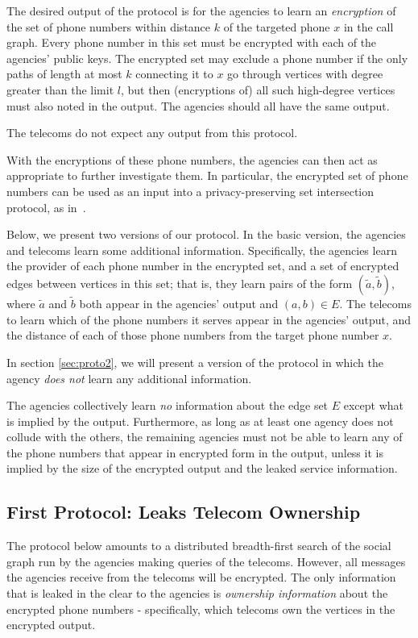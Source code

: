 The desired output of the protocol is for the agencies to learn an \emph{encryption} of the set of phone numbers within distance $k$ of the targeted phone $x$ in the call graph. Every phone number in this set must be encrypted with each of the agencies' public keys. The encrypted set may exclude a phone number if the only paths of length at most $k$ connecting it to $x$ go through vertices with degree greater than the limit $l$, but then (encryptions of) all such high-degree vertices must also noted in the output. The agencies should all have the same output.

The telecoms do not expect any output from this protocol.

With the encryptions of these phone numbers, the agencies can then act as appropriate to further investigate them. In particular, the encrypted set of phone numbers can be used as an input into a privacy-preserving set intersection protocol, as in~\cite{bandits}.

Below, we present two versions of our protocol. In the basic version, the agencies and telecoms learn some additional information. Specifically, the agencies learn the provider of each phone number in the encrypted set, and a set of encrypted edges between vertices in this set; that is, they learn pairs of the form $(\tilde{a}, \tilde{b})$, where $\tilde{a}$ and $\tilde{b}$ both appear in the agencies' output and $(a, b)\in E$. The telecoms to learn which of the phone numbers it serves appear in the agencies' output, and the distance of each of those phone numbers from the target phone number $x$.

In section \ref{sec:proto2}, we will present a version of the protocol in which the agency \emph{does not} learn any additional information.

The agencies collectively learn \emph{no} information about the edge set $E$ except what is implied by the output. Furthermore, as long as at least one agency does not collude with the others, the remaining agencies must not be able to learn any of the phone numbers that appear in encrypted form in the output, unless it is implied by the size of the encrypted output and the leaked service information.

\subsection{First Protocol: Leaks Telecom Ownership}
\label{sec:proto1}

The protocol below amounts to a distributed breadth-first search of the social graph run by the agencies making queries of the telecoms. However, all messages the agencies receive from the telecoms will be encrypted. The only information that is leaked in the clear to the agencies is \emph{ownership information} about the encrypted phone numbers - specifically, which telecoms own the vertices in the encrypted output.

